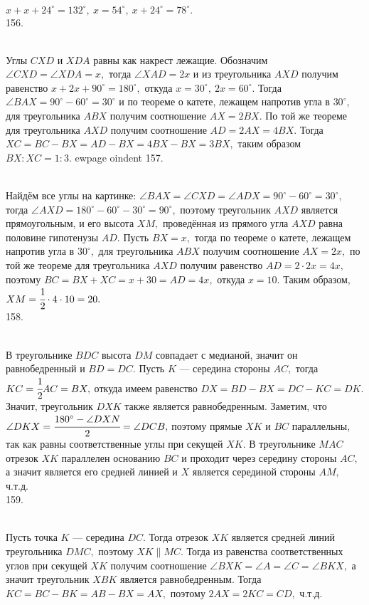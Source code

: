 $x+x+24^\circ=132^\circ,\ x=54^\circ,\ x+24^\circ=78^\circ.$\\
156. \begin{figure}[ht!]
\end{figure}\\
Углы $CXD$ и $XDA$ равны как накрест лежащие. Обозначим $\angle CXD=\angle XDA=x,$ тогда $\angle XAD=2x$ и из треугольника $AXD$ получим равенство $x+2x+90^\circ=180^\circ,$ откуда $x=30^\circ,\ 2x=60^\circ.$ Тогда $\angle BAX=90^\circ-60^\circ=30^\circ$ и по теореме о катете, лежащем напротив угла в $30^\circ,$ для треугольника $ABX$ получим соотношение $AX=2BX.$ По той же теореме для треугольника $AXD$ получим соотношение $AD=2AX=4BX.$ Тогда $XC=BC-BX=AD-BX=4BX-BX=3BX,$ таким образом $BX:XC=1:3.$
ewpage
oindent
157. \begin{figure}[ht!]
\end{figure}\\
Найдём все углы на картинке: $\angle BAX=\angle CXD=\angle ADX=90^\circ-60^\circ=30^\circ,$ тогда $\angle AXD=180^\circ-60^\circ-30^\circ=90^\circ,$ поэтому треугольник $AXD$ является прямоугольным, и его высота $XM,$ проведённая из прямого угла $AXD$ равна половине гипотенузы $AD.$ Пусть $BX=x,$ тогда по теореме о катете, лежащем напротив угла в $30^\circ,$ для треугольника $ABX$ получим соотношение $AX=2x,$ по той же теореме для треугольника $AXD$ получим равенство $AD=2\cdot2x=4x,$ поэтому $BC=BX+XC=x+30=AD=4x,$ откуда $x=10.$ Таким образом, $XM=\cfrac{1}{2}\cdot4\cdot10=20.$\\
158. \begin{figure}[ht!]
\end{figure}\\
В треугольнике $BDC$ высота $DM$ совпадает с медианой, значит он равнобедренный и $BD=DC.$ Пусть $K$ --- середина стороны $AC,$ тогда $KC=\cfrac{1}{2} AC=BX,$ откуда имеем равенство $DX=BD-BX=DC-KC=DK.$ Значит, треугольник $DXK$ также является равнобедренным. Заметим, что $\angle DKX=\cfrac{180^\circ-\angle DXN}{2}=\angle DCB,$ поэтому прямые $XK$ и $BC$ параллельны, так как равны соответственные углы при секущей $XK.$ В треугольнике $MAC$ отрезок $XK$ параллелен основанию $BC$ и проходит через середину стороны $AC,$ а значит является его средней линией и $X$ является серединой стороны $AM,$ ч.т.д.\\
159. \begin{figure}[ht!]
\end{figure}\\
Пусть точка $K$ --- середина $DC.$ Тогда отрезок $XK$ является средней линий треугольника $DMC,$ поэтому $XK\parallel MC.$ Тогда из равенства соответственных углов при секущей $XK$ получим соотношение $\angle BXK=\angle A=\angle C=\angle BKX,$ а значит треугольник $XBK$ является равнобедренным. Тогда $KC=BC-BK=AB-BX=AX,$ поэтому $2AX=2KC=CD,$ ч.т.д.

